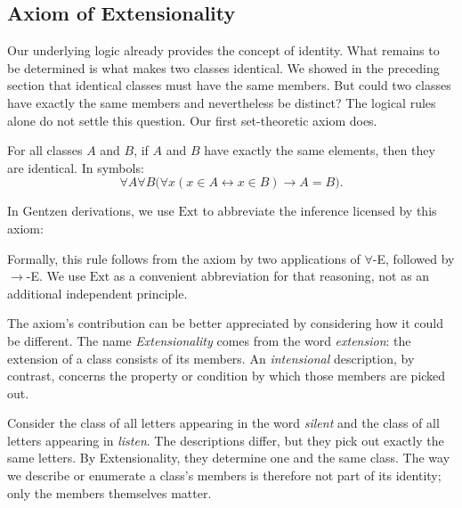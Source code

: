 
\subsection{Axiom of Extensionality}

Our underlying logic already provides the concept of identity. What remains to be determined is what makes two classes identical. We showed in the preceding section that identical classes must have the same members. But could two classes have exactly the same members and nevertheless be distinct? The logical rules alone do not settle this question. Our first set-theoretic axiom does.

\begin{axiom}
\label{ax:extensionality}
For all classes \(A\) and \(B\), if \(A\) and \(B\) have exactly the same elements, then they are identical. In symbols:
\[
\forall A\forall B
\bigl(
\forall x(x\in A\leftrightarrow x\in B)
\to A=B
\bigr).
\]
\end{axiom}

In Gentzen derivations, we use \(\mathrm{Ext}\) to abbreviate the inference licensed by this axiom:

\begin{prooftree}
\end{prooftree}

Formally, this rule follows from the axiom by two applications of \(\forall\)-E, followed by \(\to\)-E. We use \(\mathrm{Ext}\) as a convenient abbreviation for that reasoning, not as an additional independent principle.

The axiom's contribution can be better appreciated by considering how it could be different. The name \emph{Extensionality} comes from the word \emph{extension}: the extension of a class consists of its members. An \emph{intensional} description, by contrast, concerns the property or condition by which those members are picked out.

Consider the class of all letters appearing in the word \emph{silent} and the class of all letters appearing in \emph{listen}. The descriptions differ, but they pick out exactly the same letters. By Extensionality, they determine one and the same class. The way we describe or enumerate a class's members is therefore not part of its identity; only the members themselves matter.


